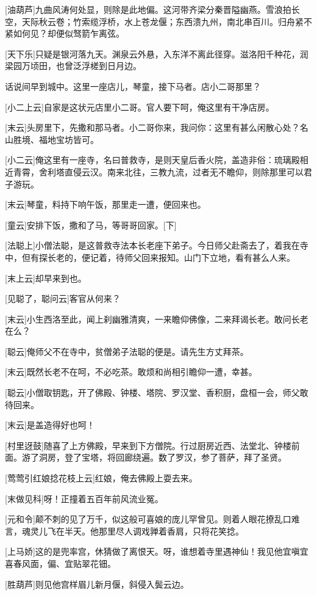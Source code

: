 \documentclass{book}
\begin{document}
[油葫芦]九曲风涛何处显，则除是此地偏。这河带齐梁分秦晋隘幽燕。雪浪拍长空，天际秋云卷；竹索缆浮桥，水上苍龙偃；东西溃九州，南北串百川。归舟紧不紧如何见？却便似驽箭乍离弦。

[天下乐]只疑是银河落九天。渊泉云外悬，入东洋不离此径穿。滋洛阳千种花，润梁园万顷田，也曾泛浮槎到日月边。

话说间早到城中。这里一座店儿，琴童，接下马者。店小二哥那里？

[小二上云]自家是这状元店里小二哥。官人要下呵，俺这里有干净店房。

[末云]头房里下，先撒和那马者。小二哥你来，我问你：这里有甚么闲散心处？名山胜境、福地宝坊皆可。

[小二云]俺这里有一座寺，名曰普救寺，是则天皇后香火院，盖造非俗：琉璃殿相近青霄，舍利塔直侵云汉。南来北往，三教九流，过者无不瞻仰，则除那里可以君子游玩。

[末云]琴童，料持下响午饭，那里走一遭，便回来也。

[童云]安排下饭，撒和了马，等哥哥回家。[下]

[法聪上]小僧法聪，是这普救寺法本长老座下弟子。今日师父赴斋去了，着我在寺中，但有探长老的，便记着，待师父回来报知。山门下立地，看有甚么人来。

[末上云]却早来到也。

[见聪了，聪问云]客官从何来？

[末云]小生西洛至此，闻上刹幽雅清爽，一来瞻仰佛像，二来拜谒长老。敢问长老在么？

[聪云]俺师父不在寺中，贫僧弟子法聪的便是。请先生方丈拜茶。

[末云]既然长老不在呵，不必吃茶。敢烦和尚相引瞻仰一遭，幸甚。

[聪云]小僧取钥匙，开了佛殿、钟楼、塔院、罗汉堂、香积厨，盘桓一会，师父敢待回来。

[末云]是盖造得好也呵！

[村里迓鼓]随喜了上方佛殿，早来到下方僧院。行过厨房近西、法堂北、钟楼前面。游了洞房，登了宝塔，将回廊绕遍。数了罗汉，参了菩萨，拜了圣贤。

[莺莺引红娘捻花枝上云]红娘，俺去佛殿上耍去来。

[末做见科]呀！正撞着五百年前风流业冤。

[元和令]颠不刺的见了万千，似这般可喜娘的庞儿罕曾见。则着人眼花撩乱口难言，魂灵儿飞在半天。他那里尽人调戏亸着香肩，只将花笑捻。

[上马娇]这的是兜率宫，休猜做了离恨天。呀，谁想着寺里遇神仙！我见他宜嗔宜喜春风面，偏、宜贴翠花钿。

[胜葫芦]则见他宫样眉儿新月偃，斜侵入鬓云边。
\end{document}
